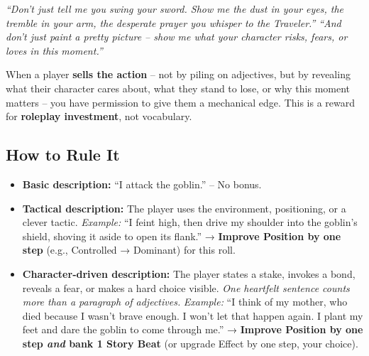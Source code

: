 \begin{tcolorbox}[
  colback=red!5!white,
  colframe=red!75!black,
  title=\textbf{Selling the Action – When Players Give You Gold},
  fonttitle=\bfseries\large,
  sharp corners,
  drop shadow,
  before skip=10pt,
  after skip=10pt
]

\textit{“Don’t just tell me you swing your sword. Show me the dust in your eyes, the tremble in your arm, the desperate prayer you whisper to the Traveler.”}
\textit{“And don’t just paint a pretty picture – show me what your character risks, fears, or loves in this moment.”}

\medskip
When a player \textbf{sells the action} – not by piling on adjectives, but by revealing what their character cares about, what they stand to lose, or why this moment matters – you have permission to give them a mechanical edge. This is a reward for \textbf{roleplay investment}, not vocabulary.

\subsection*{How to Rule It}
\begin{itemize}
  \item \textbf{Basic description:} “I attack the goblin.” – No bonus.

  \item \textbf{Tactical description:} The player uses the environment, positioning,
        or a clever tactic.  
        \textit{Example:} “I feint high, then drive my shoulder into the goblin’s
        shield, shoving it aside to open its flank.”  
        → \textbf{Improve Position by one step} (e.g., Controlled → Dominant)
        for this roll.

  \item \textbf{Character‑driven description:} The player states a stake, invokes
        a bond, reveals a fear, or makes a hard choice visible. \textit{One
        heartfelt sentence counts more than a paragraph of adjectives.}  
        \textit{Example:} “I think of my mother, who died because I wasn’t brave
        enough. I won’t let that happen again. I plant my feet and dare the
        goblin to come through me.”  
        → \textbf{Improve Position by one step \textit{and} bank 1 Story Beat}
        (or upgrade Effect by one step, your choice).
\end{itemize}


\end{tcolorbox}
